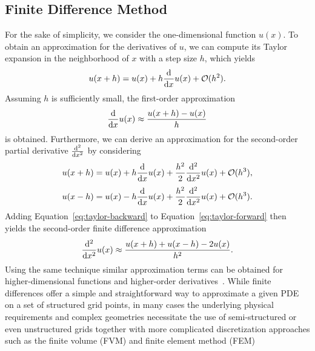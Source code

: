 \subsection{Finite Difference Method}
For the sake of simplicity, we consider the one-dimensional function $u(x)$.
To obtain an approximation for the derivatives of $u$, we can compute its Taylor expansion in the neighborhood of $x$ with a step size $h$, which yields
\begin{equation}
	u(x + h) = u(x) + h \dv{x} u(x) + \mathcal{O}(h^2).
\end{equation}
Assuming $h$ is sufficiently small, the first-order approximation 
\begin{equation}
	\dv{x} u(x) \approx \frac{u(x + h) -  u(x)}{h}
\end{equation}
is obtained.
Furthermore, we can derive an approximation for the second-order partial derivative $\dv[2]{x}$ by considering
\begin{equation}
	u(x + h) = u(x) + h \dv{x} u(x) + \frac{h^2}{2} \dv[2]{x} u(x) + \mathcal{O}(h^3),
	\label{eq:taylor-forward}
\end{equation}
\begin{equation}
	u(x - h) = u(x) - h \dv{x} u(x) + \frac{h^2}{2} \dv[2]{x} u(x) + \mathcal{O}(h^3).
	\label{eq:taylor-backward}
\end{equation}
Adding Equation~\eqref{eq:taylor-backward} to Equation~\eqref{eq:taylor-forward} then yields the second-order finite difference approximation
\begin{equation}
	 \dv[2]{x} u(x) \approx \frac{u(x + h) + u(x - h) - 2u(x)}{h^2}.
\end{equation}
Using the same technique similar approximation terms can be obtained for higher-dimensional functions and higher-order derivatives~\cite{strikwerda2004finite}.
While finite differences offer a simple and straightforward way to approximate a given PDE on a set of structured grid points, in many cases the underlying physical requirements and complex geometries necessitate the use of semi-structured or even unstructured grids together with more complicated discretization approaches such as the finite volume (FVM) and finite element method (FEM)~\cite{versteeg2007introduction,zienkiewicz2005finite}
